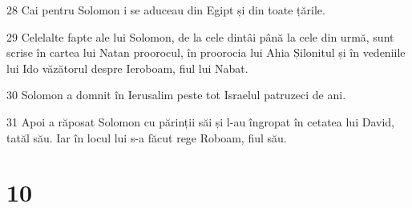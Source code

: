 \par 28 Cai pentru Solomon i se aduceau din Egipt și din toate țările.
\par 29 Celelalte fapte ale lui Solomon, de la cele dintâi până la cele din urmă, sunt scrise în cartea lui Natan proorocul, în proorocia lui Ahia Șilonitul și în vedeniile lui Ido văzătorul despre Ieroboam, fiul lui Nabat.
\par 30 Solomon a domnit în Ierusalim peste tot Israelul patruzeci de ani.
\par 31 Apoi a răposat Solomon cu părinții săi și l-au îngropat în cetatea lui David, tatăl său. Iar în locul lui s-a făcut rege Roboam, fiul său.

\chapter{10}

